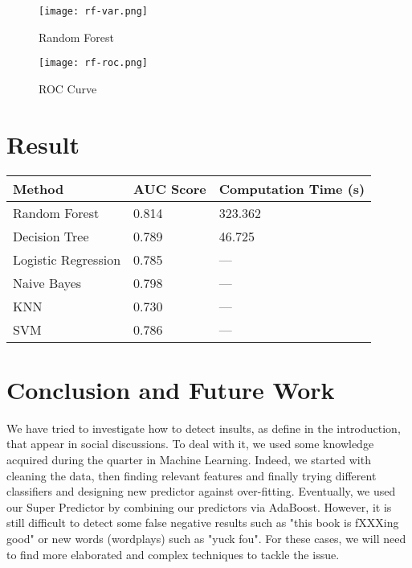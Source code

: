 \documentclass[11pt]{article}
\begin{document}
\begin{singlespacing}
\begin{Schunk}
\end{Schunk}


\begin{figure}
    \centering
    \texttt{[image: rf-var.png]}
    \caption{Random Forest}
    \label{fig:Random Forest}
\end{figure}

\begin{figure}
    \centering
    \texttt{[image: rf-roc.png]}
    \caption{ROC Curve}
    \label{fig:ROC Curve}
\end{figure}

\newpage
\section{Result}
\begin{center}
\begin{tabular}{|p{4cm}|p{4cm}|p{6cm}|}
\hline         
\textbf{Method}  	& \textbf{AUC Score}   & \textbf{Computation Time (s)} \\ \hline
Random Forest 	& 0.814 		&323.362 \\ \hline
Decision Tree    	& 0.789		&46.725   \\ \hline
Logistic Regression & 0.785		& --- \\ \hline
 Naive Bayes  		& 0.798		& --- \\ \hline
KNN				& 0.730		& --- \\ \hline
SVM				& 0.786		& --- \\ 
\hline
\end{tabular}
\end{center}


\section{Conclusion and Future Work}
We have tried to investigate how to detect insults, as define in the introduction, that appear in social
discussions. To deal with it, we used some knowledge acquired during the quarter in Machine Learning.
Indeed, we started with cleaning the data, then finding relevant features and finally trying different classifiers
and designing new predictor against over-fitting. Eventually, we used our Super Predictor by combining our
predictors via AdaBoost. However, it is still difficult to detect some false negative results such as "this book
is fXXXing good" or new words (wordplays) such as "yuck fou". For these cases, we will need to find more
elaborated and complex techniques to tackle the issue.


\end{singlespacing}
\end{document}
